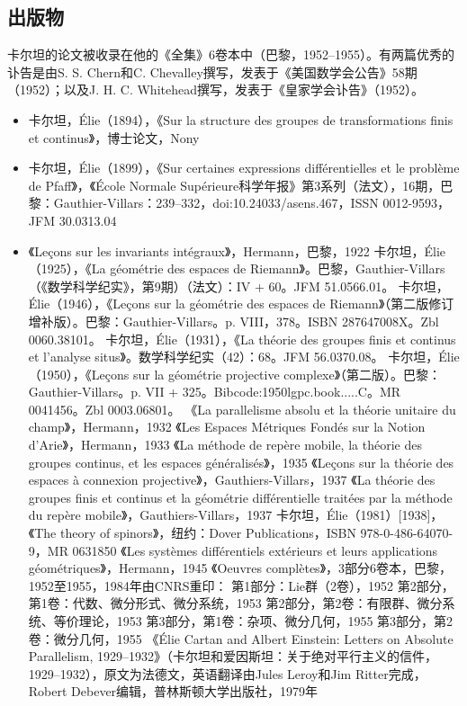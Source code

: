 \subsection{出版物}  
卡尔坦的论文被收录在他的《全集》6卷本中（巴黎，1952–1955）。有两篇优秀的讣告是由S. S. Chern和C. Chevalley撰写，发表于《美国数学会公告》58期（1952）；以及J. H. C. Whitehead撰写，发表于《皇家学会讣告》（1952）。
\begin{itemize}
\item 卡尔坦，Élie（1894），《Sur la structure des groupes de transformations finis et continus》，博士论文，Nony  
\item 卡尔坦，Élie（1899），《Sur certaines expressions différentielles et le problème de Pfaff》，《École Normale Supérieure科学年报》第3系列（法文），16期，巴黎：Gauthier-Villars：239–332，doi:10.24033/asens.467，ISSN 0012-9593，JFM 30.0313.04  
\item 《Leçons sur les invariants intégraux》，Hermann，巴黎，1922  
卡尔坦，Élie（1925），《La géométrie des espaces de Riemann》。巴黎，Gauthier-Villars（《数学科学纪实》，第9期）（法文）：IV + 60。JFM 51.0566.01。  
卡尔坦，Élie（1946），《Leçons sur la géométrie des espaces de Riemann》（第二版修订增补版）。巴黎：Gauthier-Villars。p. VIII，378。ISBN 287647008X。Zbl 0060.38101。  
卡尔坦，Élie（1931），《La théorie des groupes finis et continus et l'analyse situs》。数学科学纪实（42）：68。JFM 56.0370.08。  
卡尔坦，Élie（1950），《Leçons sur la géométrie projective complexe》（第二版）。巴黎：Gauthier-Villars。p. VII + 325。Bibcode:1950lgpc.book.....C。MR 0041456。Zbl 0003.06801。  
《La parallelisme absolu et la théorie unitaire du champ》，Hermann，1932  
《Les Espaces Métriques Fondés sur la Notion d'Arie》，Hermann，1933  
《La méthode de repère mobile, la théorie des groupes continus, et les espaces généralisés》，1935  
《Leçons sur la théorie des espaces à connexion projective》，Gauthiers-Villars，1937  
《La théorie des groupes finis et continus et la géométrie différentielle traitées par la méthode du repère mobile》，Gauthiers-Villars，1937  
卡尔坦，Élie（1981）[1938]，《The theory of spinors》，纽约：Dover Publications，ISBN 978-0-486-64070-9，MR 0631850  
《Les systèmes différentiels extérieurs et leurs applications géométriques》，Hermann，1945  
《Oeuvres complètes》，3部分6卷本，巴黎，1952至1955，1984年由CNRS重印：  
第1部分：Lie群（2卷），1952  
第2部分，第1卷：代数、微分形式、微分系统，1953  
第2部分，第2卷：有限群、微分系统、等价理论，1953  
第3部分，第1卷：杂项、微分几何，1955  
第3部分，第2卷：微分几何，1955  
《Élie Cartan and Albert Einstein: Letters on Absolute Parallelism, 1929–1932》（卡尔坦和爱因斯坦：关于绝对平行主义的信件，1929–1932），原文为法德文，英语翻译由Jules Leroy和Jim Ritter完成，Robert Debever编辑，普林斯顿大学出版社，1979年
\end{itemize}